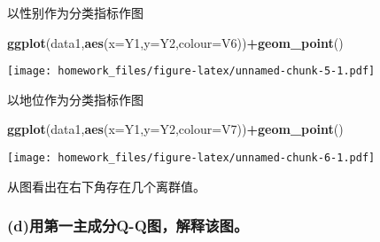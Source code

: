 \documentclass[
]{article}
\newenvironment{Shaded}{\begin{snugshade}}{\end{snugshade}}
\newcommand{\CommentTok}[1]{\textcolor[rgb]{0.56,0.35,0.01}{\textit{#1}}}
\newcommand{\DataTypeTok}[1]{\textcolor[rgb]{0.13,0.29,0.53}{#1}}
\newcommand{\FloatTok}[1]{\textcolor[rgb]{0.00,0.00,0.81}{#1}}
\newcommand{\KeywordTok}[1]{\textcolor[rgb]{0.13,0.29,0.53}{\textbf{#1}}}
\newcommand{\NormalTok}[1]{#1}
\newcommand{\OperatorTok}[1]{\textcolor[rgb]{0.81,0.36,0.00}{\textbf{#1}}}
\begin{document}
\begin{Shaded}
\end{Shaded}

以性别作为分类指标作图

\begin{Shaded}
\begin{Highlighting}[]
\KeywordTok{ggplot}\NormalTok{(data1,}\KeywordTok{aes}\NormalTok{(}\DataTypeTok{x=}\NormalTok{Y1,}\DataTypeTok{y=}\NormalTok{Y2,}\DataTypeTok{colour=}\NormalTok{V6))}\OperatorTok{+}\KeywordTok{geom_point}\NormalTok{()}
\end{Highlighting}
\end{Shaded}

\texttt{[image: homework\_files/figure-latex/unnamed-chunk-5-1.pdf]}

以地位作为分类指标作图

\begin{Shaded}
\begin{Highlighting}[]
\KeywordTok{ggplot}\NormalTok{(data1,}\KeywordTok{aes}\NormalTok{(}\DataTypeTok{x=}\NormalTok{Y1,}\DataTypeTok{y=}\NormalTok{Y2,}\DataTypeTok{colour=}\NormalTok{V7))}\OperatorTok{+}\KeywordTok{geom_point}\NormalTok{()}
\end{Highlighting}
\end{Shaded}

\texttt{[image: homework\_files/figure-latex/unnamed-chunk-6-1.pdf]}

从图看出在右下角存在几个离群值。

\hypertarget{dux7528ux7b2cux4e00ux4e3bux6210ux5206q-qux56feux89e3ux91caux8be5ux56fe}{%
\subsubsection{(d)用第一主成分Q-Q图，解释该图。}\label{dux7528ux7b2cux4e00ux4e3bux6210ux5206q-qux56feux89e3ux91caux8be5ux56fe}}
\end{document}

